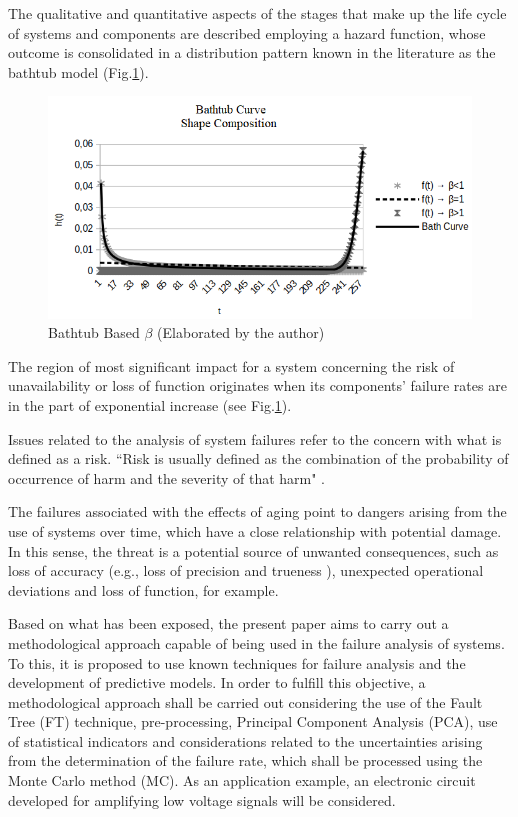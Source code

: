 \documentclass{ws-m3as}
\begin{document}
The qualitative and quantitative aspects of the stages that make up the life cycle of systems and components are described employing a hazard function, whose outcome is consolidated in a distribution pattern known in the literature as the bathtub model \cite{Klutke2003} (Fig.\ref{fig:1}).
\begin{figure} [H]
	\centering
	\includegraphics[width=0.7\linewidth]{Figures/BathCurve2}
	\caption{Bathtub Based $\beta$ (Elaborated by the author)}
	\label{fig:1}
\end{figure}

The region of most significant impact for a system concerning the risk of unavailability or loss of function originates when its components' failure rates are in the part of exponential increase (see Fig.\ref{fig:1}). 

Issues related to the analysis of system failures refer to the concern with what is defined as a risk. ``Risk is usually defined as the combination of the probability of occurrence of harm and the severity of that harm" \cite{Matsuoka2012}.

The failures associated with the effects of aging point to dangers arising from the use of systems over time, which have a close relationship with potential damage.  In this sense, the threat is a potential source of unwanted consequences, such as loss of accuracy (e.g., loss of precision and trueness \cite {VIM2012}), unexpected operational deviations and loss of function, for example.

Based on what has been exposed, the present paper aims to carry out a methodological approach capable of being used in the failure analysis of systems. To this, it is proposed to use known techniques for failure analysis and the development of predictive models. In order to fulfill this objective, a methodological approach shall be carried out considering the use of the Fault Tree (FT) technique, pre-processing, Principal Component Analysis (PCA), use of statistical indicators and considerations related to the uncertainties arising from the determination of the failure rate, which shall be processed using the Monte Carlo method (MC). As an application example, an electronic circuit developed for amplifying low voltage signals will be considered.
\end{document}
